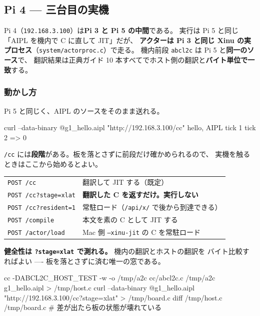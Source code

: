 \documentclass[11pt,a4paper]{ltjsarticle}
\begin{document}
\subsection{Pi 4 --- 三台目の実機}
\label{sec:xinu-pi4}

Pi 4（\texttt{192.168.3.100}）は\textbf{Pi 3 と Pi 5 の中間}である。
実行は Pi 5 と同じ「AIPL を機内で C に直して JIT」だが、
\textbf{アクターは Pi 3 と同じ Xinu の実プロセス}（\texttt{system/actorproc.c}）で走る。
機内前段 \texttt{abcl2c} は Pi 5 と\textbf{同一のソース}で、
翻訳結果は正典ガイド 10 本すべてでホスト側の翻訳と\textbf{バイト単位で一致}する。

\subsubsection*{動かし方}

Pi 5 と同じく、AIPL のソースをそのまま送れる。

\begin{term}
curl --data-binary @g1_hello.aipl "http://192.168.3.100/cc"
hello, AIPL
tick 1
tick 2
=> 0
\end{term}

\texttt{/cc} には\textbf{段階}がある。板を落とさずに前段だけ確かめられるので、
実機を触るときはここから始めるとよい。

\begin{center}
\small
\begin{tabular}{@{}ll@{}}
\toprule
\texttt{POST /cc} & 翻訳して JIT する（既定） \\
\texttt{POST /cc?stage=xlat} & \textbf{翻訳した C を返すだけ。実行しない} \\
\texttt{POST /cc?resident=1} & 常駐ロード（\texttt{/api/x/} で後から到達できる） \\
\texttt{POST /compile} & 本文を素の C として JIT する \\
\texttt{POST /actor/load} & Mac 側 \texttt{--xinu-jit} の C を常駐ロード \\
\bottomrule
\end{tabular}
\end{center}

\textbf{健全性は \texttt{?stage=xlat} で測れる。} 機内の翻訳とホストの翻訳を
バイト比較すればよい ---- 板を落とさずに済む唯一の窓である。

\begin{term}
cc -DABCL2C_HOST_TEST -w -o /tmp/a2c cc/abcl2c.c
/tmp/a2c g1_hello.aipl > /tmp/host.c
curl --data-binary @g1_hello.aipl "http://192.168.3.100/cc?stage=xlat" > /tmp/board.c
diff /tmp/host.c /tmp/board.c        # 差が出たら板の状態が壊れている
\end{term}
\end{document}
